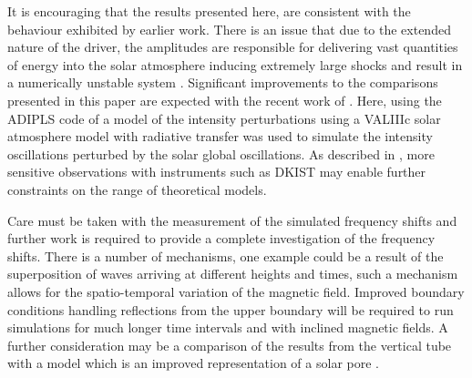 \documentclass[physics,article,submit,pdftex,moreauthors]{Definitions/mdpi}
\begin{document}
It is encouraging that the results presented here, are consistent with the behaviour exhibited by earlier work. There is an issue that due to the extended nature of the driver, the amplitudes are responsible for delivering vast quantities of energy into the solar atmosphere inducing extremely large shocks and result in a numerically unstable system \cite{Santamaria2015}. Significant improvements to the comparisons presented in this paper are expected with the  recent work of \cite{Kostogryz2021}. Here, using the ADIPLS code of \cite{Christensen-Dalsgaard2008} a model of the intensity perturbations using a VALIIIc solar atmosphere model with radiative transfer was used to simulate the intensity oscillations perturbed by the solar global oscillations. As described in \cite{Rast2016}, more sensitive observations with instruments such as DKIST may enable further constraints on the range of theoretical models. 

Care must be taken with the measurement of the simulated frequency shifts and further work is required to provide a complete  investigation of the frequency shifts. There is a number of mechanisms, one example could be a result of the superposition of waves arriving at different heights and times, such a mechanism allows for the spatio-temporal variation of the   magnetic field. Improved boundary conditions handling reflections from the upper boundary  will be required to run simulations for much longer time intervals and with inclined magnetic fields. A further consideration may be a comparison of the results from the vertical tube with a model which is an improved representation of a solar pore \cite{Simon1970} \cite{Cameron2007}.
\end{document}

